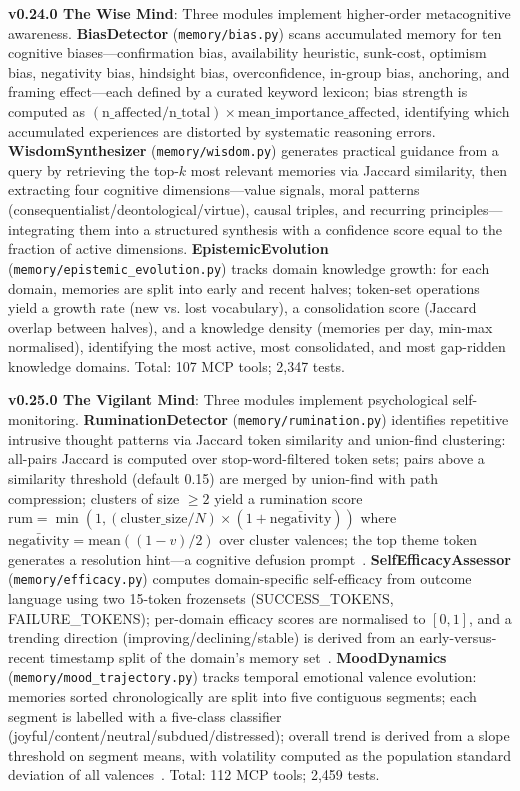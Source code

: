 \documentclass[conference]{IEEEtran}
\begin{document}
\textbf{v0.24.0 The Wise Mind}: Three modules implement higher-order metacognitive awareness. \textbf{BiasDetector} (\texttt{memory/bias.py}) scans accumulated memory for ten cognitive biases---confirmation bias, availability heuristic, sunk-cost, optimism bias, negativity bias, hindsight bias, overconfidence, in-group bias, anchoring, and framing effect---each defined by a curated keyword lexicon; bias strength is computed as $(\text{n\_affected} / \text{n\_total}) \times \text{mean\_importance\_affected}$, identifying which accumulated experiences are distorted by systematic reasoning errors. \textbf{WisdomSynthesizer} (\texttt{memory/wisdom.py}) generates practical guidance from a query by retrieving the top-$k$ most relevant memories via Jaccard similarity, then extracting four cognitive dimensions---value signals, moral patterns (consequentialist/deontological/virtue), causal triples, and recurring principles---integrating them into a structured synthesis with a confidence score equal to the fraction of active dimensions. \textbf{EpistemicEvolution} (\texttt{memory/epistemic\_evolution.py}) tracks domain knowledge growth: for each domain, memories are split into early and recent halves; token-set operations yield a growth rate (new vs. lost vocabulary), a consolidation score (Jaccard overlap between halves), and a knowledge density (memories per day, min-max normalised), identifying the most active, most consolidated, and most gap-ridden knowledge domains. Total: 107 MCP tools; 2,347 tests.

\textbf{v0.25.0 The Vigilant Mind}: Three modules implement psychological self-monitoring. \textbf{RuminationDetector} (\texttt{memory/rumination.py}) identifies repetitive intrusive thought patterns via Jaccard token similarity and union-find clustering: all-pairs Jaccard is computed over stop-word-filtered token sets; pairs above a similarity threshold (default 0.15) are merged by union-find with path compression; clusters of size $\geq 2$ yield a rumination score $\text{rum} = \min(1, (\text{cluster\_size}/N) \times (1 + \bar{\text{negativity}}))$ where $\bar{\text{negativity}} = \text{mean}((1-v)/2)$ over cluster valences; the top theme token generates a resolution hint---a cognitive defusion prompt~\cite{hayes2004}. \textbf{SelfEfficacyAssessor} (\texttt{memory/efficacy.py}) computes domain-specific self-efficacy from outcome language using two 15-token frozensets (SUCCESS\_TOKENS, FAILURE\_TOKENS); per-domain efficacy scores are normalised to $[0,1]$, and a trending direction (improving/declining/stable) is derived from an early-versus-recent timestamp split of the domain's memory set~\cite{bandura1977}. \textbf{MoodDynamics} (\texttt{memory/mood\_trajectory.py}) tracks temporal emotional valence evolution: memories sorted chronologically are split into five contiguous segments; each segment is labelled with a five-class classifier (joyful/content/neutral/subdued/distressed); overall trend is derived from a slope threshold on segment means, with volatility computed as the population standard deviation of all valences~\cite{davidson2004}. Total: 112 MCP tools; 2,459 tests.
\end{document}
